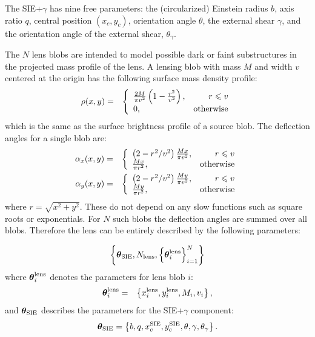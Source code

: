 \documentclass[useAMS,usenatbib]{mn2e}
\begin{document}
The SIE+$\gamma$ has nine free parameters:
the (circularized) Einstein radius $b$, axis ratio $q$, central position
$(x_c, y_c)$, orientation angle $\theta$, the external shear $\gamma$, and the
orientation angle of the external shear, $\theta_{\gamma}$.

The $N$ lens blobs are intended to model possible dark or faint substructures
in the projected mass profile of the lens.
A lensing blob with mass $M$ and width $v$
centered at the origin has the following surface mass density profile:
\begin{eqnarray}
\rho(x, y) &=& \left\{
\begin{array}{lr}
\frac{2M}{\pi v^2}\left(1 - \frac{r^2}{v^2}\right), & r \leq v\\
0, & \textnormal{otherwise}
\end{array}
\right.
\end{eqnarray}
which is the same as the surface brightness profile of a source blob.
The deflection angles for a single blob are:
\begin{eqnarray}
\alpha_x(x, y) &=&
\left\{
\begin{array}{lr}
\left(2 - r^2/v^2\right)\frac{Mx}{\pi v^2}, & r \leq v\\
\frac{Mx}{\pi r^2}, & \textnormal{otherwise}
\end{array}
\right.\\
\alpha_y(x, y) &=&
\left\{
\begin{array}{lr}
\left(2 - r^2/v^2\right)\frac{My}{\pi v^2}, & r \leq v\\
\frac{My}{\pi r^2}, & \textnormal{otherwise}
\end{array}
\right.
\end{eqnarray}
where $r=\sqrt{x^2 + y^2}$. These do not depend on any slow functions such
as square roots or exponentials.
For $N$ such blobs the deflection angles are
summed over all blobs. Therefore the lens can be entirely described by
the following parameters:

\begin{eqnarray}
\left\{
\boldsymbol{\theta}_{\rm SIE},
N_{\rm lens}, \left\{\boldsymbol{\theta}^{\rm lens}_i\right\}_{i=1}^N
\right\}
\end{eqnarray}
where $\boldsymbol{\theta}^{\rm lens}_i$ denotes the parameters for lens blob $i$:
\begin{eqnarray}
\boldsymbol{\theta}^{\rm lens}_i &=& \left\{x_i^{\rm lens}, y_i^{\rm lens}, M_i, v_i
\right\},
\end{eqnarray}
and $\boldsymbol{\theta}_{\rm SIE}$ describes the parameters for the SIE+$\gamma$
component:
\begin{eqnarray}
\boldsymbol{\theta}_{\rm SIE} = \left\{
b, q, x_c^{\rm SIE}, y_c^{\rm SIE}, \theta, \gamma, \theta_\gamma
\right\}.
\end{eqnarray}
\end{document}
